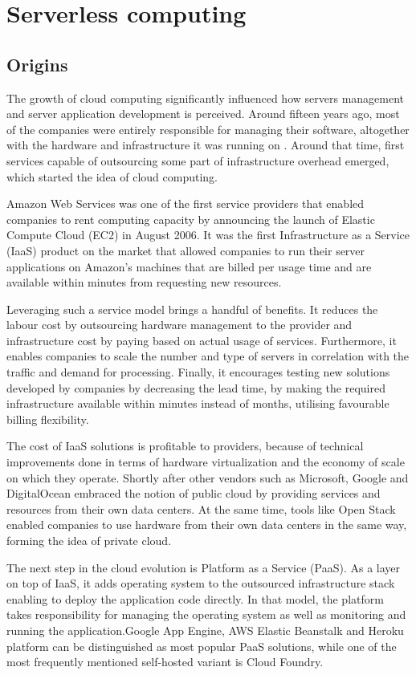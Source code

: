 \chapter{Serverless computing}

\section{Origins}

The growth of cloud computing significantly influenced how servers management and server application development is perceived. Around fifteen years ago, most of the companies were entirely responsible for managing their software, altogether with the hardware and infrastructure it was running on \cite{RobertsChapin2017}. Around that time, first services capable of outsourcing some part of infrastructure overhead emerged, which started the idea of cloud computing.

Amazon Web Services was one of the first service providers that enabled companies to rent computing capacity by announcing the launch of Elastic Compute Cloud (EC2) in August 2006. It was the first Infrastructure as a Service (IaaS) product on the market that allowed companies to run their server applications on Amazon's machines that are billed per usage time and are available within minutes from requesting new resources.

Leveraging such a service model brings a handful of benefits. It reduces the labour cost by outsourcing hardware management to the provider and infrastructure cost by paying based on actual usage of services. Furthermore, it enables companies to scale the number and type of servers in correlation with the traffic and demand for processing. Finally, it encourages testing new solutions developed by companies by decreasing the lead time, by making the required infrastructure available within minutes instead of months, utilising favourable billing flexibility.

The cost of IaaS solutions is profitable to providers, because of technical improvements done in terms of hardware virtualization and the economy of scale on which they operate. Shortly after other vendors such as Microsoft, Google and DigitalOcean embraced the notion of public cloud by providing services and resources from their own data centers. At the same time, tools like Open Stack enabled companies to use hardware from their own data centers in the same way, forming the idea of private cloud.

The next step in the cloud evolution is Platform as a Service (PaaS). As a layer on top of IaaS, it adds operating system to the outsourced infrastructure stack enabling to deploy the application code directly. In that model, the platform takes responsibility for managing the operating system as well as monitoring and running the application.Google App Engine, AWS Elastic Beanstalk and Heroku platform can be distinguished as most popular PaaS solutions, while one of the most frequently mentioned self-hosted variant is Cloud Foundry.

